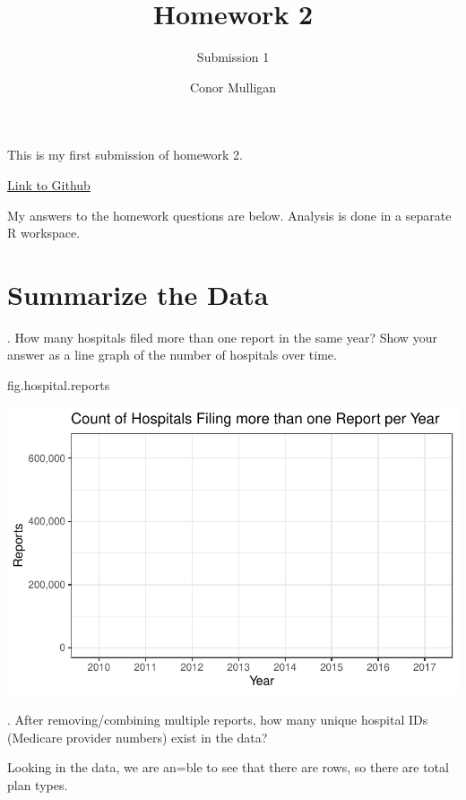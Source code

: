 \documentclass[
  letterpaper,
  DIV=11,
  numbers=noendperiod]{scrartcl}
\title{Homework 2}
\subtitle{Submission 1}
\author{Conor Mulligan}
\date{}
\newenvironment{Shaded}{\begin{snugshade}}{\end{snugshade}}
\newcommand{\NormalTok}[1]{\textcolor[rgb]{0.00,0.23,0.31}{#1}}
\begin{document}
\maketitle

This is my first submission of homework 2.

\href{https://github.com/cmulliga/homework-2}{Link to Github}

My answers to the homework questions are below. Analysis is done in a
separate R workspace.

\newpage

\section{Summarize the Data}\label{summarize-the-data}

\vspace{.2in}

. How many hospitals filed more than one report in the same
year? Show your answer as a line graph of the number of hospitals over
time.

\begin{Shaded}
\begin{Highlighting}[]
\NormalTok{fig.hospital.reports}
\end{Highlighting}
\end{Shaded}

\includegraphics{hwk2-answers_files/figure-pdf/unnamed-chunk-3-1.pdf}

\newpage

. After removing/combining multiple reports, how many unique
hospital IDs (Medicare provider numbers) exist in the data?

Looking in the data, we are an=ble to see that there are rows, so there
are total plan types.
\end{document}
